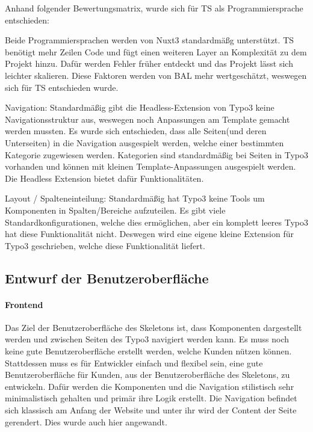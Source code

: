 \pagebreak

Anhand folgender Bewertungsmatrix, wurde sich für TS als Programmiersprache entschieden:


Beide Programmiersprachen werden von Nuxt3 standardmäßg unterstützt. \acs{TS} benötigt mehr Zeilen Code und fügt einen weiteren Layer an Komplexität zu dem Projekt hinzu. Dafür werden Fehler früher entdeckt und das Projekt lässt sich leichter skalieren. Diese Faktoren werden von \acs{BAL} mehr wertgeschätzt, weswegen sich für \acs{TS} entschieden wurde.

Navigation: Standardmäßig gibt die Headless-Extension von Typo3 keine Navigationsstruktur aus, weswegen noch Anpassungen am Template gemacht werden mussten. Es wurde sich entschieden, dass alle Seiten(und deren Unterseiten) in die Navigation ausgespielt werden, welche einer bestimmten Kategorie zugewiesen werden. Kategorien sind standardmäßig bei Seiten in Typo3 vorhanden und können mit kleinen Template-Anpassungen ausgespielt werden. Die Headless Extension bietet dafür Funktionalitäten.

Layout / Spalteneinteilung: Standardmäßig hat Typo3 keine Tools um Komponenten in Spalten/Bereiche aufzuteilen. Es gibt viele Standardkonfigurationen, welche dies ermöglichen, aber ein komplett leeres Typo3 hat diese Funktionalität nicht. Deswegen wird eine eigene kleine Extension für Typo3 geschrieben, welche diese Funktionalität liefert.


\subsection{Entwurf der Benutzeroberfläche}
\label{sec:Benutzeroberflaeche} 

\paragraph{Frontend} 
\linebreak
Das Ziel der Benutzeroberfläche des Skeletons ist, dass Komponenten dargestellt werden und zwischen Seiten des Typo3 navigiert werden kann. Es muss noch keine gute Benutzeroberfläche erstellt werden, welche Kunden nützen können. Stattdessen muss es für Entwickler einfach und flexibel sein, eine gute Benutzeroberfläche für Kunden, aus der Benutzeroberfläche des Skeletons, zu entwickeln. Dafür werden die Komponenten und die Navigation stilistisch sehr minimalistisch gehalten und primär ihre Logik erstellt. Die Navigation befindet sich klassisch am Anfang der Website und unter ihr wird der Content der Seite gerendert. Dies wurde auch hier angewandt.


